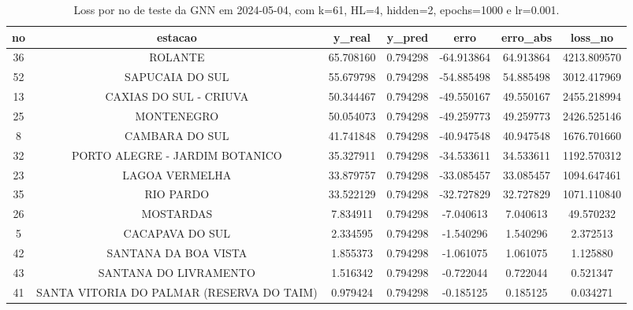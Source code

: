\begin{table}[h]
\centering
\caption{Loss por no de teste da GNN em 2024-05-04, com k=61, HL=4, hidden=2, epochs=1000 e lr=0.001.}
\label{tab:gnn_loss_k61_hl4_h2_e1000_d20240504}
\begin{tabular}{ccccccc}
\toprule
no & estacao & y\_real & y\_pred & erro & erro\_abs & loss\_no \\
\midrule
36 & ROLANTE & 65.708160 & 0.794298 & -64.913864 & 64.913864 & 4213.809570 \\
52 & SAPUCAIA DO SUL & 55.679798 & 0.794298 & -54.885498 & 54.885498 & 3012.417969 \\
13 & CAXIAS DO SUL - CRIUVA & 50.344467 & 0.794298 & -49.550167 & 49.550167 & 2455.218994 \\
25 & MONTENEGRO & 50.054073 & 0.794298 & -49.259773 & 49.259773 & 2426.525146 \\
8 & CAMBARA DO SUL & 41.741848 & 0.794298 & -40.947548 & 40.947548 & 1676.701660 \\
32 & PORTO ALEGRE - JARDIM BOTANICO & 35.327911 & 0.794298 & -34.533611 & 34.533611 & 1192.570312 \\
23 & LAGOA VERMELHA & 33.879757 & 0.794298 & -33.085457 & 33.085457 & 1094.647461 \\
35 & RIO PARDO & 33.522129 & 0.794298 & -32.727829 & 32.727829 & 1071.110840 \\
26 & MOSTARDAS & 7.834911 & 0.794298 & -7.040613 & 7.040613 & 49.570232 \\
5 & CACAPAVA DO SUL & 2.334595 & 0.794298 & -1.540296 & 1.540296 & 2.372513 \\
42 & SANTANA DA BOA VISTA & 1.855373 & 0.794298 & -1.061075 & 1.061075 & 1.125880 \\
43 & SANTANA DO LIVRAMENTO & 1.516342 & 0.794298 & -0.722044 & 0.722044 & 0.521347 \\
41 & SANTA VITORIA DO PALMAR (RESERVA DO TAIM) & 0.979424 & 0.794298 & -0.185125 & 0.185125 & 0.034271 \\
\bottomrule
\end{tabular}
\end{table}
